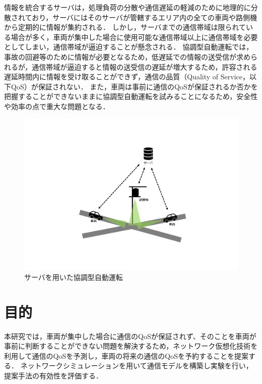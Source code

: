 \documentclass[a4paper,11pt,uplatex]{ujreport}
\begin{document}
    情報を統合するサーバは，処理負荷の分散や通信遅延の軽減のために地理的に分散されており\cite{edge}，サーバにはそのサーバが管轄するエリア内の全ての車両や路側機から定期的に情報が集約される．
    しかし，サーバまでの通信帯域は限られている場合が多く，車両が集中した場合に使用可能な通信帯域以上に通信帯域を必要としてしまい，通信帯域が逼迫することが懸念される\cite{C-V2X}．
    協調型自動運転では，事故の回避等のために情報が必要となるため，低遅延での情報の送受信が求められるが，通信帯域が逼迫すると情報の送受信の遅延が増大するため，許容される遅延時間内に情報を受け取ることができず，通信の品質（Quality of Service，以下QoS）が保証されない．
    また，車両は事前に通信のQoSが保証されるか否かを把握することができないままに協調型自動運転を試みることになるため，安全性や効率の点で重大な問題となる．


  \begin{figure}[tb]
    \centering
    \includegraphics[width=\linewidth]{img/サーバを用いた協調型自動運転.pdf}
    \caption{サーバを用いた協調型自動運転}
    \label{fig:CAD}
  \end{figure}

\section{目的}
\label{sec:目的}

    本研究では，車両が集中した場合に通信のQoSが保証されず、そのことを車両が事前に判断することができない問題を解決するため，ネットワーク仮想化技術を利用して通信のQoSを予測し，車両の将来の通信のQoSを予約することを提案する．
    ネットワークシミュレーションを用いて通信モデルを構築し実験を行い，提案手法の有効性を評価する．
\end{document}
